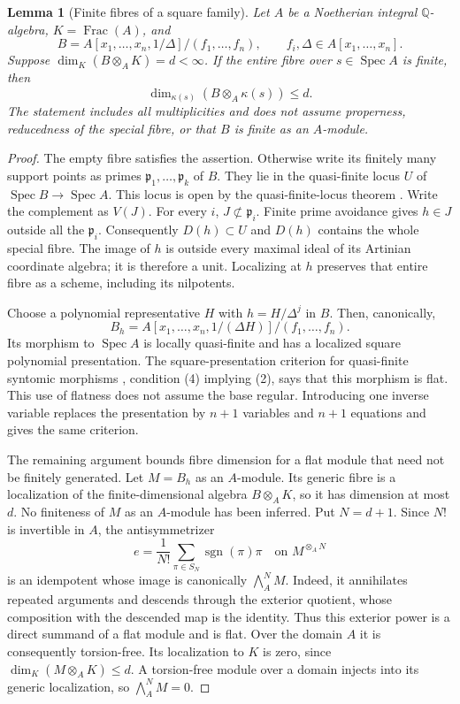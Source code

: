 \documentclass[11pt,a4paper]{article}
\newtheorem{lemma}[theorem]{Lemma}\newtheorem{proposition}[theorem]{Proposition}
\theoremstyle{remark}\newtheorem{remark}[theorem]{Remark}
\newcommand{\Spec}{\operatorname{Spec}}\newcommand{\tr}{\operatorname{tr}}
\begin{document}
\begin{lemma}[Finite fibres of a square family]\label{length:bound}
Let $A$ be a Noetherian integral $\mathbb Q$-algebra, $K=\operatorname{Frac}(A)$,
and
\[
 B=A[x_1,\ldots,x_n,1/\Delta]/(f_1,\ldots,f_n),
 \qquad f_i,\Delta\in A[x_1,\ldots,x_n].
\]
Suppose $\dim_K(B\otimes_AK)=d<\infty$. If the entire fibre over
$s\in\Spec A$ is finite, then
\[
 \dim_{\kappa(s)}(B\otimes_A\kappa(s))\le d.
\]
The statement includes all multiplicities and does not assume properness,
reducedness of the special fibre, or that $B$ is finite as an $A$-module.
\end{lemma}
\begin{proof}
The empty fibre satisfies the assertion. Otherwise write its finitely many
support points as primes $\mathfrak p_1,\ldots,\mathfrak p_k$ of $B$.
They lie in the quasi-finite locus $U$ of $\Spec B\to\Spec A$. This locus
is open by the quasi-finite-locus theorem \cite{stacks-qf}. Write the
complement as $V(J)$. For every $i$, $J\not\subset\mathfrak p_i$.
Finite prime avoidance gives $h\in J$ outside all the $\mathfrak p_i$.
Consequently $D(h)\subset U$ and $D(h)$ contains the whole special fibre.
The image of $h$ is outside every maximal ideal of its Artinian coordinate
algebra; it is therefore a unit. Localizing at $h$ preserves that entire
fibre as a scheme, including its nilpotents.

Choose a polynomial representative $H$ with $h=H/\Delta^j$ in $B$.
Then, canonically,
\[
 B_h=A[x_1,\ldots,x_n,1/(\Delta H)]/(f_1,\ldots,f_n).
\]
Its morphism to $\Spec A$ is locally quasi-finite and has a localized
square polynomial presentation. The square-presentation criterion for
quasi-finite syntomic morphisms \cite{stacks-square}, condition (4)
implying (2), says that this morphism is flat. This use of flatness does
not assume the base regular. Introducing one inverse variable replaces
the presentation by $n+1$ variables and $n+1$ equations and gives the
same criterion.

The remaining argument bounds fibre dimension for a flat module that
need not be finitely generated. Let $M=B_h$ as an $A$-module. Its generic fibre is a localization of the
finite-dimensional algebra $B\otimes_AK$, so it has dimension at most $d$.
No finiteness of $M$ as an $A$-module has been inferred. Put $N=d+1$.
Since $N!$ is invertible in $A$, the antisymmetrizer
\[
 e=\frac1{N!}\sum_{\pi\in S_N}\operatorname{sgn}(\pi)\pi
       \quad\text{on }M^{\otimes_A N}
\]
is an idempotent whose image is canonically $\bigwedge_A^N M$.
Indeed, it annihilates repeated arguments and descends through the
exterior quotient, whose composition with the descended map is the
identity. Thus this exterior power is a direct summand of a flat module
and is flat. Over the domain $A$ it is consequently torsion-free.
Its localization to $K$ is zero, since $\dim_K(M\otimes_AK)\le d$.
A torsion-free module over a domain injects into its generic localization,
so $\bigwedge_A^N M=0$.


\end{proof}
\end{document}
